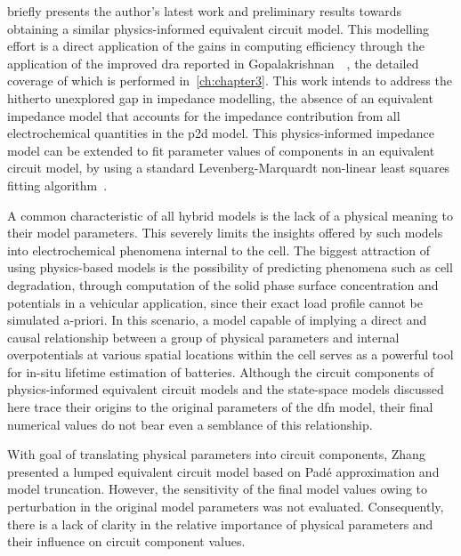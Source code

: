 

  briefly presents  the author's  latest work  and preliminary
results towards  obtaining a similar physics-informed  equivalent circuit model.
This  modelling  effort is  a  direct  application  of  the gains  in  computing
efficiency  through  the  application  of the  improved  \gls{dra}  reported  in
Gopalakrishnan~\etal{}~\cite{Gopalakrishnan2017},   the  detailed   coverage  of
which  is performed  in~\cref{ch:chapter3}.  This work  intends  to address  the
hitherto  unexplored  gap  in  impedance  modelling, \ie{}  the  absence  of  an
equivalent impedance  model that  accounts for  the impedance  contribution from
all  electrochemical quantities  in the  \gls{p2d} model.  This physics-informed
impedance  model can  be  extended  to fit  parameter  values  of components  in
an  equivalent circuit  model,  \eg{} by  using  a standard  Levenberg-Marquardt
non-linear least squares fitting algorithm~\cite{Levenberg1944, Marquardt1963}.


A common characteristic of  all hybrid models is the lack  of a physical meaning
to their  model parameters. This  severely limits  the insights offered  by such
models  into  electrochemical  phenomena  internal  to  the  cell.  The  biggest
attraction  of  using physics-based  models  is  the possibility  of  predicting
phenomena such as cell degradation, \eg{} through computation of the solid phase
surface concentration  and potentials  in a  vehicular application,  since their
exact  load profile  cannot be  simulated a-priori.  In this  scenario, a  model
capable of implying a direct and causal relationship between a group of physical
parameters and internal  overpotentials at various spatial  locations within the
cell serves  as a powerful  tool for  in-situ lifetime estimation  of batteries.
Although the  circuit components  of physics-informed equivalent  circuit models
and the  state-space models discussed here  trace their origins to  the original
parameters of  the \gls{dfn}  model, their  final numerical  values do  not bear
even a  semblance of this relationship.


With  goal   of  translating   physical  parameters  into   circuit  components,
Zhang~\etal{}~\cite{Zhang2017} presented a lumped equivalent circuit model based
on Padé  approximation and  model truncation. However,  the sensitivity  of the
final model  values owing to perturbation  in the original model  parameters was
not  evaluated.  Consequently, there  is  a  lack  of  clarity in  the  relative
importance  of physical  parameters  and their  influence  on circuit  component
values.


